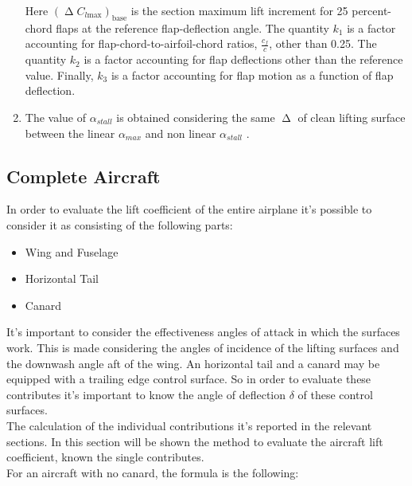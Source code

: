\begin{enumerate}
\begin{equation}
	\end{equation}
	\noindent
	Here $\left(\upDelta C_{l\text{max}}\right)_{\text{base}}$ is the section maximum lift increment for 25 percent-chord flaps at the reference flap-deflection angle. The quantity $k_1$ is a factor accounting for flap-chord-to-airfoil-chord ratios, $\frac{c_{f}}{c}$, other than 0.25. The quantity $k_2$ is a factor accounting for flap deflections other than the reference value. Finally, $k_3$ is a factor accounting for flap motion as a function of flap deflection.
	\item The value of $\alpha_{stall}$ is obtained considering the same $\upDelta$ of clean lifting surface between the linear $\alpha_{max}$  and non linear $\alpha_{stall}$ .
\end{enumerate}




		




\subsection{Complete Aircraft}

In order to evaluate the lift coefficient of the entire airplane it's possible to consider it as consisting of the following parts\cite{ roskam2002airplane}:

\begin{itemize}
\item Wing and Fuselage
\item Horizontal Tail
\item Canard
\end{itemize}

It's important to consider the effectiveness angles of attack in which the surfaces work. This is made considering the angles of incidence of the lifting surfaces and the downwash angle aft of the wing. An horizontal tail and a canard may be equipped with a trailing edge control surface. So in order to evaluate these contributes it's important to know the angle of deflection $\delta$ of these control surfaces.\\
The calculation of the individual contributions it's reported in the relevant sections. In this section will be shown the method to evaluate the aircraft lift coefficient, known the single contributes.\\
For an aircraft with no canard, the formula is the following:

